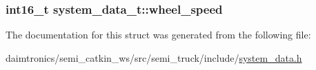 \subsubsection[{\texorpdfstring{wheel\+\_\+speed}{wheel_speed}}]{\setlength{\rightskip}{0pt plus 5cm}int16\+\_\+t system\+\_\+data\+\_\+t\+::wheel\+\_\+speed}\hypertarget{structsystem__data__t_aee87dc3d6b863923bd540334bdaf7198}{}\label{structsystem__data__t_aee87dc3d6b863923bd540334bdaf7198}


The documentation for this struct was generated from the following file\+:\begin{DoxyCompactItemize}
\item 
daimtronics/semi\+\_\+catkin\+\_\+ws/src/semi\+\_\+truck/include/\hyperlink{semi__catkin__ws_2src_2semi__truck_2include_2system__data_8h}{system\+\_\+data.\+h}\end{DoxyCompactItemize}
